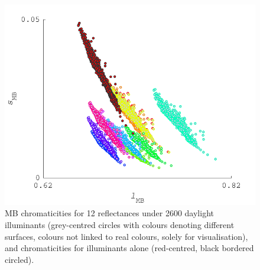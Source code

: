 \begin{figure}[htbp]
    \includegraphics[max width=\textwidth]{figs/comp/melcomp_1/BasicMB.pdf}
    \caption{\gls{MB} chromaticities for 12 reflectances under 2600 daylight illuminants (grey-centred circles with colours denoting different surfaces, colours not linked to real colours, solely for visualisation), and chromaticities for illuminants alone (red-centred, black bordered circled).}
    \label{fig:MB}
\end{figure} 

